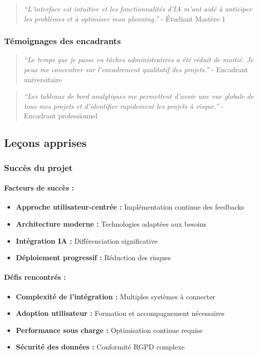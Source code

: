 \begin{quote}
\textit{``L'interface est intuitive et les fonctionnalités d'IA m'ont aidé à anticiper les problèmes et à optimiser mon planning.''} - Étudiant Mastère 1
\end{quote}

\subsubsection{Témoignages des encadrants}
\begin{quote}
\textit{``Le temps que je passe en tâches administratives a été réduit de moitié. Je peux me concentrer sur l'encadrement qualitatif des projets.''} - Encadrant universitaire
\end{quote}

\begin{quote}
\textit{``Les tableaux de bord analytiques me permettent d'avoir une vue globale de tous mes projets et d'identifier rapidement les projets à risque.''} - Encadrant professionnel
\end{quote}

\subsection{Leçons apprises}

\subsubsection{Succès du projet}
\paragraph{Facteurs de succès :}
\begin{itemize}
    \item \textbf{Approche utilisateur-centrée :} Implémentation continue des feedbacks
    \item \textbf{Architecture moderne :} Technologies adaptées aux besoins
    \item \textbf{Intégration IA :} Différenciation significative
    \item \textbf{Déploiement progressif :} Réduction des risques
\end{itemize}

\paragraph{Défis rencontrés :}
\begin{itemize}
    \item \textbf{Complexité de l'intégration :} Multiples systèmes à connecter
    \item \textbf{Adoption utilisateur :} Formation et accompagnement nécessaires
    \item \textbf{Performance sous charge :} Optimisation continue requise
    \item \textbf{Sécurité des données :} Conformité RGPD complexe
\end{itemize}

